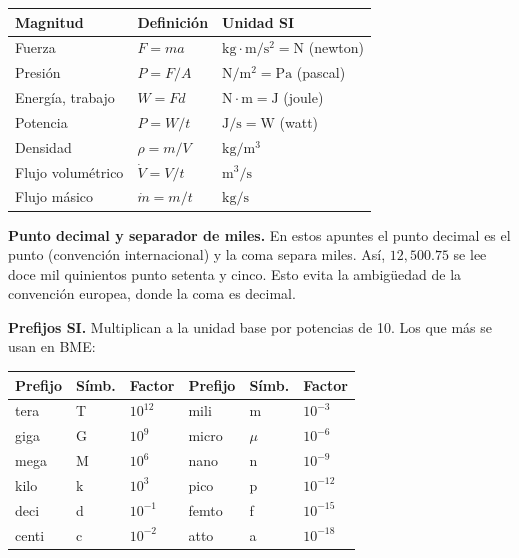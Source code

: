 \begin{center}
\renewcommand{\arraystretch}{1.4}
\begin{tabular}{|L{3.5cm}|L{4.5cm}|L{4.5cm}|}
\hline
\textbf{Magnitud} & \textbf{Definición} & \textbf{Unidad SI} \\
\hline
Fuerza & $F = m a$ & $\mathrm{kg\cdot m/s^2} = \mathrm{N}$ (newton) \\
\hline
Presión & $P = F/A$ & $\mathrm{N/m^2} = \mathrm{Pa}$ (pascal) \\
\hline
Energía, trabajo & $W = F d$ & $\mathrm{N\cdot m} = \mathrm{J}$ (joule) \\
\hline
Potencia & $P = W/t$ & $\mathrm{J/s} = \mathrm{W}$ (watt) \\
\hline
Densidad & $\rho = m/V$ & $\mathrm{kg/m^3}$ \\
\hline
Flujo volumétrico & $\dot V = V/t$ & $\mathrm{m^3/s}$ \\
\hline
Flujo másico & $\dot m = m/t$ & $\mathrm{kg/s}$ \\
\hline
\end{tabular}
\end{center}

\begin{notafija}
\textbf{Punto decimal y separador de miles.} En estos apuntes el punto
decimal es el punto (convención internacional) y la coma separa miles.
Así, $12{,}500.75$ se lee doce mil quinientos punto setenta y cinco.
Esto evita la ambigüedad de la convención europea, donde la coma es
decimal.
\end{notafija}

\textbf{Prefijos SI.} Multiplican a la unidad base por potencias de 10.
Los que más se usan en BME:

\begin{center}
\renewcommand{\arraystretch}{1.3}
\begin{tabular}{|L{2cm}|C{1.5cm}|C{2cm}|L{2cm}|C{1.5cm}|C{2cm}|}
\hline
\textbf{Prefijo} & \textbf{Símb.} & \textbf{Factor} &
\textbf{Prefijo} & \textbf{Símb.} & \textbf{Factor} \\
\hline
tera & T & $10^{12}$ & mili & m & $10^{-3}$ \\
\hline
giga & G & $10^{9}$ & micro & $\mu$ & $10^{-6}$ \\
\hline
mega & M & $10^{6}$ & nano & n & $10^{-9}$ \\
\hline
kilo & k & $10^{3}$ & pico & p & $10^{-12}$ \\
\hline
deci & d & $10^{-1}$ & femto & f & $10^{-15}$ \\
\hline
centi & c & $10^{-2}$ & atto & a & $10^{-18}$ \\
\hline
\end{tabular}
\end{center}

